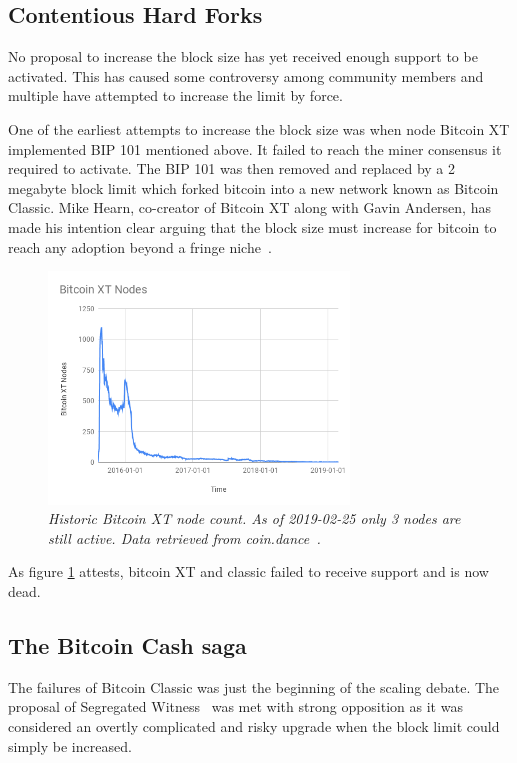 \subsection{Contentious Hard Forks}

No proposal to increase the block size has yet received enough support to be activated. This has caused some controversy among community members and multiple have attempted to increase the limit by force. 

One of the earliest attempts to increase the block size was when node Bitcoin XT implemented BIP 101 mentioned above. It failed to reach the miner consensus it required to activate. The BIP 101 was then removed and replaced by a 2 megabyte block limit which forked bitcoin into a new network known as Bitcoin Classic. Mike Hearn, co-creator of Bitcoin XT along with Gavin Andersen, has made his intention clear arguing that the block size must increase for bitcoin to reach any adoption beyond a fringe niche~\cite{hearn:classic}. 

\begin{figure}[!htb]
	\hspace*{-0.7cm} 
	\centering
	\includegraphics[width=8cm]{external/Bitcoin_XT_Nodes.png}
	\caption{\textit{Historic Bitcoin XT node count. As of 2019-02-25 only 3 nodes are still active. Data retrieved from coin.dance~\cite{coin:dance}.}}
	\label{fig:xt_nodes}
	\hspace*{2mm} 	
\end{figure}

As figure \ref{fig:xt_nodes} attests, bitcoin XT and classic failed to receive support and is now dead.

\subsection{The Bitcoin Cash saga}

The failures of Bitcoin Classic was just the beginning of the scaling debate. The proposal of Segregated Witness~\cite{bip:0141:segwit} was met with strong opposition as it was considered an overtly complicated and risky upgrade when the block limit could simply be increased. 

